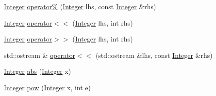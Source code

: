\begin{DoxyCompactItemize}
\hyperlink{class_integer}{Integer} \hyperlink{class_integer_aea18c4ff2ec0c30ed29a4010e892d385}{operator\%} (\hyperlink{class_integer}{Integer} lhs, const \hyperlink{class_integer}{Integer} \&rhs)
\item 
\hyperlink{class_integer}{Integer} \hyperlink{class_integer_aaf32bc4191034ed250a064aa6796ade5}{operator$<$$<$} (\hyperlink{class_integer}{Integer} lhs, int rhs)
\item 
\hyperlink{class_integer}{Integer} \hyperlink{class_integer_a06b0180ba9f20ffd4401155763a03119}{operator$>$$>$} (\hyperlink{class_integer}{Integer} lhs, int rhs)
\item 
std\-::ostream \& \hyperlink{class_integer_a76099b70bb34d31b3874482f89e24ccd}{operator$<$$<$} (std\-::ostream \&lhs, const \hyperlink{class_integer}{Integer} \&rhs)
\item 
\hyperlink{class_integer}{Integer} \hyperlink{class_integer_ac872a9e1c5a2e8e1457baf75e439f8da}{abs} (\hyperlink{class_integer}{Integer} x)
\item 
\hyperlink{class_integer}{Integer} \hyperlink{class_integer_a952b384ed1bfaf53196af505c20ca8d8}{pow} (\hyperlink{class_integer}{Integer} x, int e)
\end{DoxyCompactItemize}


